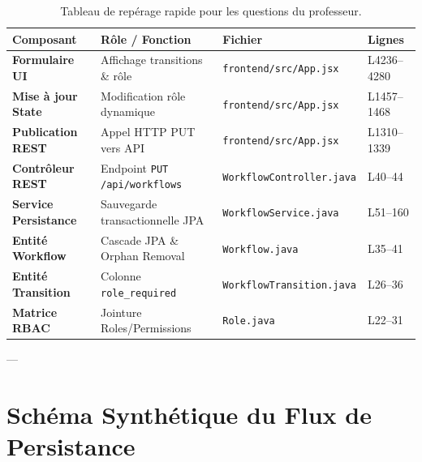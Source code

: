 \documentclass[11pt,a4paper]{article}
\begin{document}
\begin{table}[H]
\centering
\small
\begin{tabular}{>{\bfseries}p{3.2cm} p{3.8cm} p{5.5cm} p{2.0cm}}
\toprule
\color{navyprimary}Composant & \color{navyprimary}Rôle / Fonction & \color{navyprimary}Fichier & \color{navyprimary}Lignes \\
\midrule
Formulaire UI & Affichage transitions \& rôle & \texttt{frontend/src/App.jsx} & L4236--4280 \\
Mise à jour State & Modification rôle dynamique & \texttt{frontend/src/App.jsx} & L1457--1468 \\
Publication REST & Appel HTTP PUT vers API & \texttt{frontend/src/App.jsx} & L1310--1339 \\
Contrôleur REST & Endpoint \texttt{PUT /api/workflows} & \texttt{WorkflowController.java} & L40--44 \\
Service Persistance & Sauvegarde transactionnelle JPA & \texttt{WorkflowService.java} & L51--160 \\
Entité Workflow & Cascade JPA \& Orphan Removal & \texttt{Workflow.java} & L35--41 \\
Entité Transition & Colonne \texttt{role\_required} & \texttt{WorkflowTransition.java} & L26--36 \\
Matrice RBAC & Jointure Roles/Permissions & \texttt{Role.java} & L22--31 \\
\bottomrule
\end{tabular}
\caption{Tableau de repérage rapide pour les questions du professeur.}
\end{table}

---

\section{Schéma Synthétique du Flux de Persistance}
\end{document}
